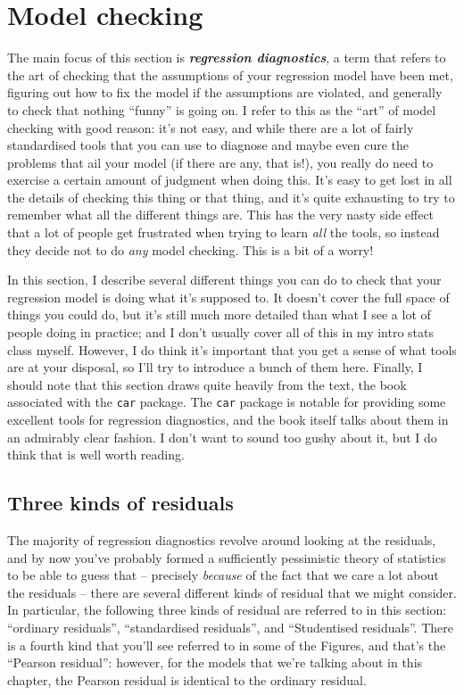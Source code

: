 \documentclass[
]{book}
\begin{document}
\hypertarget{regressiondiagnostics}{%
\section{Model checking}\label{regressiondiagnostics}}

The main focus of this section is \textbf{\emph{regression diagnostics}}, a term that refers to the art of checking that the assumptions of your regression model have been met, figuring out how to fix the model if the assumptions are violated, and generally to check that nothing ``funny'' is going on. I refer to this as the ``art'' of model checking with good reason: it's not easy, and while there are a lot of fairly standardised tools that you can use to diagnose and maybe even cure the problems that ail your model (if there are any, that is!), you really do need to exercise a certain amount of judgment when doing this. It's easy to get lost in all the details of checking this thing or that thing, and it's quite exhausting to try to remember what all the different things are. This has the very nasty side effect that a lot of people get frustrated when trying to learn \emph{all} the tools, so instead they decide not to do \emph{any} model checking. This is a bit of a worry!

In this section, I describe several different things you can do to check that your regression model is doing what it's supposed to. It doesn't cover the full space of things you could do, but it's still much more detailed than what I see a lot of people doing in practice; and I don't usually cover all of this in my intro stats class myself. However, I do think it's important that you get a sense of what tools are at your disposal, so I'll try to introduce a bunch of them here. Finally, I should note that this section draws quite heavily from the \citet{Fox2011} text, the book associated with the \texttt{car} package. The \texttt{car} package is notable for providing some excellent tools for regression diagnostics, and the book itself talks about them in an admirably clear fashion. I don't want to sound too gushy about it, but I do think that \citet{Fox2011} is well worth reading.

\hypertarget{three-kinds-of-residuals}{%
\subsection{Three kinds of residuals}\label{three-kinds-of-residuals}}

The majority of regression diagnostics revolve around looking at the residuals, and by now you've probably formed a sufficiently pessimistic theory of statistics to be able to guess that -- precisely \emph{because} of the fact that we care a lot about the residuals -- there are several different kinds of residual that we might consider. In particular, the following three kinds of residual are referred to in this section: ``ordinary residuals'', ``standardised residuals'', and ``Studentised residuals''. There is a fourth kind that you'll see referred to in some of the Figures, and that's the ``Pearson residual'': however, for the models that we're talking about in this chapter, the Pearson residual is identical to the ordinary residual.
\end{document}
